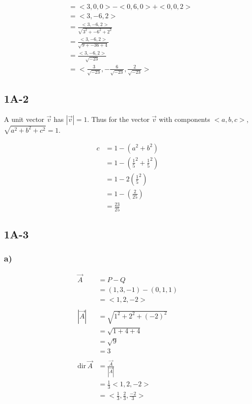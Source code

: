     \begin{align*}
        &= <3, 0, 0> - <0,6,0> + <0,0,2>\\
        &= <3,-6,2>\\
        &= \frac{<3,-6,2>}{\sqrt{3^2 + -6^2 + 2^2}}\\
        &= \frac{<3,-6,2>}{\sqrt{9 + -36 + 4}}\\
        &= \frac{<3,-6,2>}{\sqrt{-23}}\\
        &= <\frac{3}{\sqrt{-23}}, -\frac{6}{\sqrt{-23}},\frac{2}{\sqrt{-23}}>
    \end{align*}
    
\subsection*{1A-2}

A unit vector $\vec{v}$ has $|\vec{v}| = 1$.
Thus for the vector $\vec{v}$ with components $<a, b, c>$,
$\sqrt{a^2 + b^2 + c^2} = 1$.

\begin{align*}
 c &= 1 - (a^2 + b^2)\\
  &= 1 - (\frac{1}{5}^2 + \frac{1}{5}^2)\\
  &= 1 - 2(\frac{1}{5}^2)\\
  &= 1 - (\frac{2}{25})\\
  &= \frac{23}{25}
\end{align*}



\subsection*{1A-3}

\subsubsection*{a)}

    \begin{align*}
    \vec{A} &= P - Q \\
    &= (1,3,-1) - (0,1,1) \\
    &= <1,2,-2> \\
    \\
    |\vec{A}| &= \sqrt{1^2 + 2^2 + (-2)^2}\\
    &=\sqrt{1+4+4}\\
    &=\sqrt{9}\\
    &=3\\
    \\
    \text{dir} \ \vec{A} &= \frac{\vec{A}}{|\vec{A}|}\\
    &= \frac{1}{3} <1,2,-2>\\
    &= <\frac{1}{3},\frac{2}{3},\frac{-2}{3}>\\
    \end{align*}



